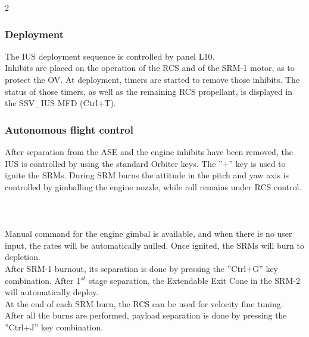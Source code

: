 \documentclass[Space_Shuttle_Vessel_Manual.tex]{subfiles}
\begin{document}
\begin{multicols*}{2}
\subsubsection{Deployment}
The IUS deployment sequence is controlled by panel L10.\\
Inhibits are placed on the operation of the RCS and of the SRM-1 motor, as to protect the OV. At deployment, timers are started to remove those inhibits. The status of those timers, as well as the remaining RCS propellant, is displayed in the SSV\_IUS MFD (Ctrl+T).

\subsubsection{Autonomous flight control}
After separation from the ASE and the engine inhibits have been removed, the IUS is controlled by using the standard Orbiter keys. The ''+'' key is used to ignite the SRMs. During SRM burns the attitude in the pitch and yaw axis is controlled by gimballing the engine nozzle, while roll remains under RCS control.
\\
\\
\\
\\
Manual command for the engine gimbal is available, and when there is no user input, the rates will be automatically nulled. Once ignited, the SRMs will burn to depletion.\\
After SRM-1 burnout, its separation is done by pressing the ''Ctrl+G'' key combination. After 1$^{st}$ stage separation, the Extendable Exit Cone in the SRM-2 will automatically deploy.\\
At the end of each SRM burn, the RCS can be used for velocity fine tuning.\\
After all the burns are performed, payload separation is done by pressing the ''Ctrl+J'' key combination.


\end{multicols*}
\end{document}
